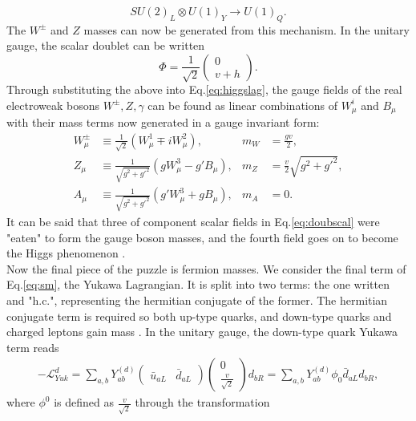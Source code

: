 \documentclass[a4paper,12pt]{article}
\begin{document}
\begin{equation}
    \label{eq:symbreak}
    SU(2)_L\otimes U(1)_Y \to U(1)_Q.
\end{equation}
The $W^\pm$ and $Z$ masses can now be generated from this mechanism. 
In the unitary gauge, the scalar doublet can be written
\begin{equation}
    \label{eq:unig}
    \Phi = \frac{1}{\sqrt{2}}\begin{pmatrix}0\\v+h\end{pmatrix}.
\end{equation}
Through substituting the above into Eq.\eqref{eq:higgslag}, the gauge fields of the real electroweak bosons $W^{\pm},Z,\gamma$ can be found as linear combinations of $W^i_\mu$ and $B_\mu$ with their mass terms now generated in a gauge invariant form:
\begin{align}
    \label{eq:gagmix}
    W^\pm_\mu &\equiv \frac{1}{\sqrt{2}}(W_\mu^1 \mp iW_\mu^2), & m_W &= \frac{gv}{2}, \\
    Z_\mu &\equiv \frac{1}{\sqrt{g^2+g'^2}}(gW^3_\mu-g'B_\mu), & m_Z &= \frac{v}{2}\sqrt{g^2+g'^2},\\
    A_\mu &\equiv \frac{1}{\sqrt{g^2+g'^2}}(g'W_\mu^3+gB_\mu), & m_A &= 0.
\end{align}
It can be said that three of component scalar fields in Eq.\eqref{eq:doubscal} were "eaten" to form the gauge boson masses, and the fourth field goes on to become the Higgs phenomenon \cite{o}.\\
Now the final piece of the puzzle is fermion masses. 
We consider the final term of Eq.\eqref{eq:sm}, the Yukawa Lagrangian. 
It is split into two terms: the one written and "h.c.", representing the hermitian conjugate of the former.
The hermitian conjugate term is required so both up-type quarks, and down-type quarks and charged leptons gain mass \cite{m}. 
In the unitary gauge, the down-type quark Yukawa term reads
\begin{align}
    \label{eq:yuk}
    -\mathcal{L}_{Yuk}^d = \sum_{a,b} Y^{(d)}_{ab} \begin{pmatrix} \bar{u}_{aL} & \bar{d}_{aL}\end{pmatrix}\begin{pmatrix}0\\\frac{v}{\sqrt{2}}\end{pmatrix}d_{bR} = \sum_{a,b}Y^{(d)}_{ab}\phi_0\bar{d}_{aL}d_{bR},
\end{align}
where $\phi^0$ is defined as $\frac{v}{\sqrt{2}}$ through the transformation
\end{document}
